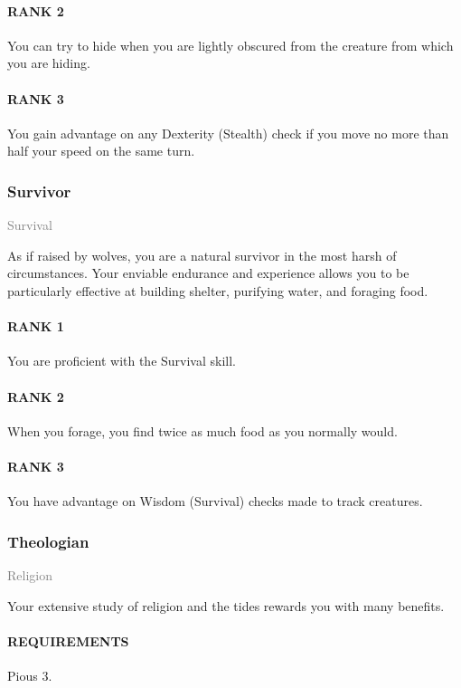 \paragraph{RANK 2} You can try to hide when you are lightly obscured from the creature from which you are hiding.
\paragraph{RANK 3} You gain advantage on any Dexterity (Stealth) check if you move no more than half your speed on the same turn.

\subsubsection{Survivor} \label{feat::survivor}
\small{\textcolor{gray}{Survival}}

\normalsize
As if raised by wolves, you are a natural survivor in the most harsh of circumstances.
Your enviable endurance and experience allows you to be particularly effective at building shelter, purifying water, and foraging food.
\paragraph{RANK 1} You are proficient with the Survival skill.
\paragraph{RANK 2} When you forage, you find twice as much food as you normally would.
\paragraph{RANK 3} You have advantage on Wisdom (Survival) checks made to track creatures.

\subsubsection{Theologian} \label{feat::theologian}
\small{\textcolor{gray}{Religion}}

\normalsize
Your extensive study of religion and the tides rewards you with many benefits.
\paragraph{REQUIREMENTS} Pious 3.

